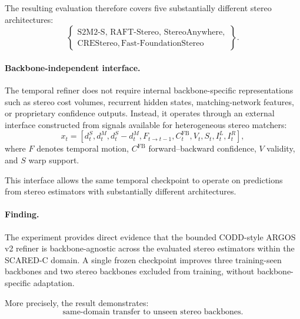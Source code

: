 \documentclass[11pt,a4paper]{article}
\begin{document}
The resulting evaluation therefore covers five substantially different stereo
architectures:
\begin{equation}
    \left\{
    \begin{array}{c}
        \text{S2M2-S},\,
        \text{RAFT-Stereo},\,
        \text{StereoAnywhere},\\
        \text{CREStereo},\,
        \text{Fast-FoundationStereo}
    \end{array}
    \right\}.
\end{equation}

\paragraph{Backbone-independent interface.}

The temporal refiner does not require internal backbone-specific representations
such as stereo cost volumes, recurrent hidden states, matching-network features,
or proprietary confidence outputs. Instead, it operates through an external
interface constructed from signals available for heterogeneous stereo matchers:
\begin{equation}
    x_t
    =
    \left[
        d_t^{S},
        d_t^{M},
        d_t^{S}-d_t^{M},
        F_{t\rightarrow t-1},
        C_t^{\mathrm{FB}},
        V_t,
        S_t,
        I_t^{L},
        I_t^{R}
    \right],
\end{equation}
where \(F\) denotes temporal motion, \(C^{\mathrm{FB}}\) forward--backward
confidence, \(V\) validity, and \(S\) warp support.

This interface allows the same temporal checkpoint to operate on predictions
from stereo estimators with substantially different architectures.

\paragraph{Finding.}

The experiment provides direct evidence that the bounded CODD-style ARGOS v2
refiner is backbone-agnostic across the evaluated stereo estimators within the
SCARED-C domain. A single frozen checkpoint improves three training-seen
backbones and two stereo backbones excluded from training, without
backbone-specific adaptation.

More precisely, the result demonstrates:
\begin{equation}
    \boxed{
    \text{same-domain transfer to unseen stereo backbones}
    }.
\end{equation}
\end{document}
